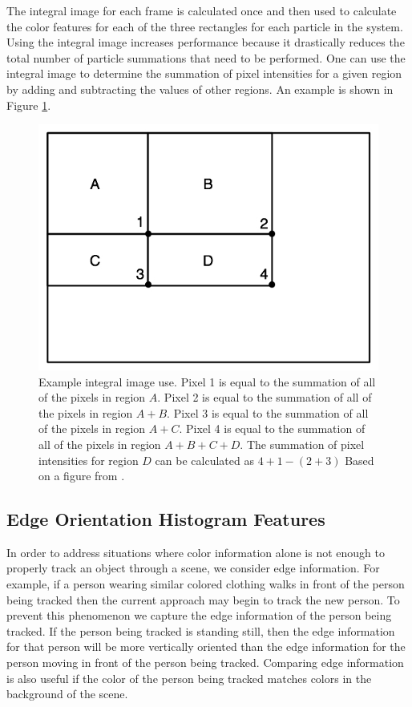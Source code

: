 \documentclass[11pt]{article}
\begin{document}
The integral image for each frame is calculated once and then used to calculate the color features for each of the three rectangles for each particle in the system. Using the integral image increases performance because it drastically reduces the total number of particle summations that need to be performed. One can use the integral image to determine the summation of pixel intensities for a given region by adding and subtracting the values of other regions. An example is shown in Figure \ref{fig:integralimguse}.

 \begin{figure}[H]
\centering
\includegraphics[scale=.4]{img/IntegralImageUse.jpg}
\caption{Example integral image use. Pixel 1 is equal to the summation of all of the pixels in region $A$. Pixel 2 is equal to the summation of all of the pixels in region $A+B$. Pixel 3 is equal to the summation of all of the pixels in region $A+C$. Pixel 4 is equal to the summation of all of the pixels in region $A+B+C+D$. The summation of pixel intensities for region $D$ can be calculated as $4+1-(2+3)$  Based on a figure from \cite{facedetection}.}
\label{fig:integralimguse}
\end{figure}


\subsection{Edge Orientation Histogram Features}
\label{sec:edgehist}

In order to address situations where color information alone is not enough to properly track an object through a scene, we consider edge information. For example, if a person wearing similar colored clothing walks in front of the person being tracked then the current approach may begin to track the new person. To prevent this phenomenon we capture the edge information of the person being tracked. If the person being tracked is standing still, then the edge information for that person will be more vertically oriented than the edge information for the person moving in front of the person being tracked. Comparing edge information is also useful if the color of the person being tracked matches colors in the background of the scene. 
\end{document}
